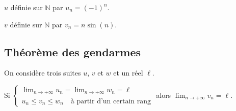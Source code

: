 \documentclass[french]{book}
\newcommand{\N}{\mathbb {N}}
\newcommand{\ie}{\leq}
\newcommand{\ds}{\displaystyle}
\newcommand{\limn}{\lim_{n\rightarrow +\infty}}
\newcommand{\limpinf}[1][x]{\ds\lim_{#1\rightarrow +\infty}}
\begin{document}
\begin{exemple}
$u$ définie sur $\N$ par $u_{n}=(-1)^{n}$.

$v$ définie sur $\N$ par $v_{n}=n\sin(n)$.
\end{exemple}

\subsection{Théorème des gendarmes}

\begin{prop}
On considère trois suites $u$, $v$ et $w$ et un réel $\ell$.
\par Si \quad
$\left\{\begin{array}{l}
\limn u_{n}=\limn w_{n}=\ell \\
u_{n} \ie v_{n} \ie w_{n} \quad \text{à partir d'un certain rang}
\end{array}\right.
$
\qquad alors \quad $\limn v_{n}=\ell$.
\end{prop}
\end{document}
